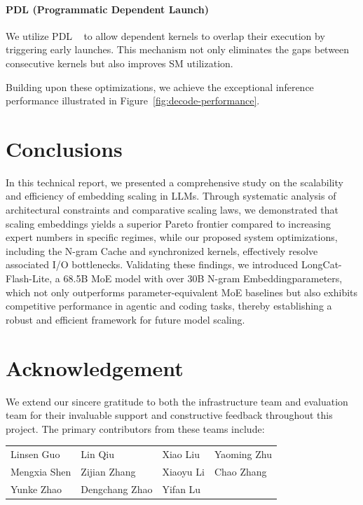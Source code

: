\documentclass{article}
\newcommand{\longcat}{LongCat-Flash-Lite\xspace}
\newcommand{\method}{N-gram Embedding}
\begin{document}
\paragraph{PDL (Programmatic Dependent Launch)} 
We utilize PDL ~\citep{pdl_nvidia} to allow dependent kernels to overlap their execution by triggering early launches. This mechanism not only eliminates the gaps between consecutive kernels but also improves SM utilization.

Building upon these optimizations, we achieve the exceptional inference performance illustrated in Figure~\ref{fig:decode-performance}.


\section{Conclusions}
In this technical report, we presented a comprehensive study on the scalability and efficiency of embedding scaling in LLMs. Through systematic analysis of architectural constraints and comparative scaling laws, we demonstrated that scaling embeddings yields a superior Pareto frontier compared to increasing expert numbers in specific regimes, while our proposed system optimizations, including the N-gram Cache and synchronized kernels, effectively resolve associated I/O bottlenecks. Validating these findings, we introduced \longcat, a 68.5B MoE model with over 30B \method parameters, which not only outperforms parameter-equivalent MoE baselines but also exhibits competitive performance in agentic and coding tasks, thereby establishing a robust and efficient framework for future model scaling.

\section{Acknowledgement}
We extend our sincere gratitude to both the infrastructure team and evaluation team for their invaluable support and constructive feedback throughout this project. The primary contributors from these teams include:

\begin{tabular}{p{}p{}p{}p{}}
Linsen Guo & Lin Qiu & Xiao Liu & Yaoming Zhu \\
Mengxia Shen & Zijian Zhang & Xiaoyu Li & Chao Zhang \\
Yunke Zhao & Dengchang Zhao & Yifan Lu &  \\
\end{tabular}

\clearpage




  
\end{document}
